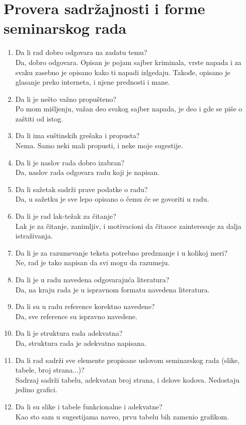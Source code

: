 \documentclass[a4paper]{report}
\begin{document}
\section{Provera sadržajnosti i forme seminarskog rada}

\begin{enumerate}
\item Da li rad dobro odgovara na zadatu temu?\\
Da, dobro odgovara. Opisan je pojam sajber kriminala, vrste napada i za svaku zasebno je opisano kako ti napadi izlgedaju. Takođe, opisano je glasanje preko interneta, i njene prednosti i mane.
\item Da li je nešto važno propušteno?\\
Po mom mišljenju, važan deo svakog sajber napada, je deo i gde se piše o zaštiti od istog.
\item Da li ima suštinskih grešaka i propusta?\\
Nema. Samo neki mali propusti, i neke moje sugestije.
\item Da li je naslov rada dobro izabran?\\
Da, naslov rada odgovara radu koji je napisan.
\item Da li sažetak sadrži prave podatke o radu?\\
Da, u sažetku je sve lepo opisano o čemu će se govoriti u radu.
\item Da li je rad lak-težak za čitanje?\\
Lak je za čitanje, zanimljiv, i motivacioni da čitaoce zainteresuje za dalja istraživanja.
\item Da li je za razumevanje teksta potrebno predznanje i u kolikoj meri?\\
Ne, rad je tako napisan da svi mogu da razumeju.
\item Da li je u radu navedena odgovarajuća literatura?\\
Da, na kraju rada je u ispravnom formatu navedena literatura.
\item Da li su u radu reference korektno navedene?\\
Da, sve reference su ispravno navedene.
\item Da li je struktura rada adekvatna?\\
Da, struktura rada je adekvatno napisana. 
\item Da li rad sadrži sve elemente propisane uslovom seminarskog rada (slike, tabele, broj strana...)?\\
Sadrzaj sadrži tabelu, adekvatan broj strana, i delove kodova. Nedostaju jedino grafici.
\item Da li su slike i tabele funkcionalne i adekvatne?\\
Kao sto sam u sugestijama naveo, prvu tabelu bih zamenio grafikom.
\end{enumerate}
\end{document}
